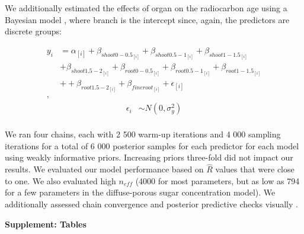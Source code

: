 \documentclass{article}\usepackage[]{graphicx}\usepackage[]{color}
\begin{document}
We additionally estimated the effects of organ on the radiocarbon age using a Bayesian model \citep{brms, R}, where branch is the intercept since, again, the predictors are discrete groups:

\begin{align*}
y_i &= \alpha_{[i]} + \beta_{shoot0-0.5_{[i]}} + \beta_{shoot0.5-1_{[i]}} + \beta_{shoot1-1.5_{[i]}}\\
&+ \beta_{shoot1.5-2_{[i]}} + \beta_{root0-0.5_{[i]}} + \beta_{root0.5-1_{[i]}} + \beta_{root1-1.5_{[i]}}\\
&+ + \beta_{root1.5-2_{[i]}} + \beta_{fineroot_{[i]}} +\epsilon_{[i]}\\,
\end{align*}
\begin{align*}
\epsilon_i & \sim N(0,\sigma^2_y) \\
\end{align*}

We ran four chains, each with 2 500 warm-up iterations and 4 000 sampling iterations for a total of 6 000 posterior samples for each predictor for each model using weakly informative priors. Increasing priors three-fold did not impact our results. We evaluated our model performance based on $\hat{R}$ values that were close to one. We also evaluated high $n_{eff}$ (4000 for most parameters, but as low as 794 for a few parameters in the diffuse-porous sugar concentration model). We additionally assessed chain convergence and posterior predictive checks visually \citep{BDA}. 



\textbf{\LARGE{Supplement: Tables}} 
\end{document}
